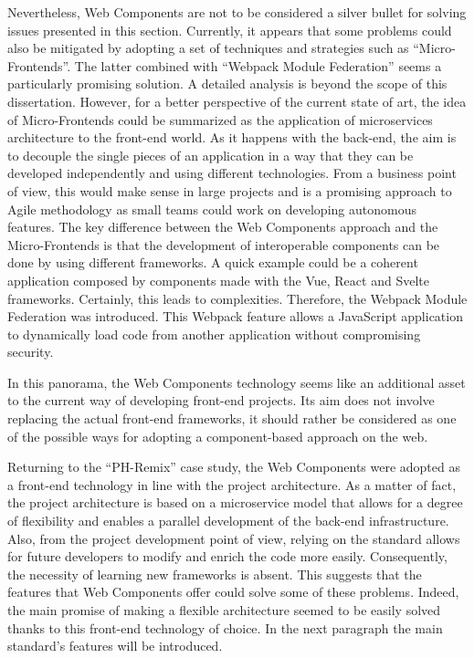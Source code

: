 Nevertheless, Web Components are not to be considered a silver bullet for solving issues presented in this section. Currently, it appears that some problems could also be mitigated by adopting a set of techniques and strategies such as “Micro-Frontends”. The latter combined with “Webpack Module Federation” seems a particularly promising solution. A detailed analysis is beyond the scope of this dissertation. However, for a better perspective of the current state of art, the idea of Micro-Frontends could be summarized as the application of microservices architecture to the front-end world. As it happens with the back-end, the aim is to decouple the single pieces of an application in a way that they can be developed independently and using different technologies. From a business point of view, this would make sense in large projects and is a promising approach to Agile methodology as small teams could work on developing autonomous features. The key difference between the Web Components approach and the Micro-Frontends is that the development of interoperable components can be done by using different frameworks. A quick example could be a coherent application composed by components made with the Vue, React and Svelte frameworks. Certainly, this leads to complexities. Therefore, the Webpack Module Federation was introduced. This Webpack feature allows a JavaScript application to dynamically load code from another application without compromising security.

In this panorama, the Web Components technology seems like an additional asset to the current way of developing front-end projects. Its aim does not involve replacing the actual front-end frameworks, it should rather be considered as one of the possible ways for adopting a component-based approach on the web. 

Returning to the “PH-Remix” case study, the Web Components were adopted as a front-end technology in line with the project architecture. As a matter of fact, the project architecture is based on a microservice model that allows for a degree of flexibility and enables a parallel development of the back-end infrastructure. Also, from the project development point of view, relying on the standard allows for future developers to modify and enrich the code more easily. Consequently, the necessity of learning new frameworks is absent. This suggests that the features that Web Components offer could solve some of these problems. Indeed, the main promise of making a flexible architecture seemed to be easily solved thanks to this front-end technology of choice. In the next paragraph the main standard’s features will be introduced. 

